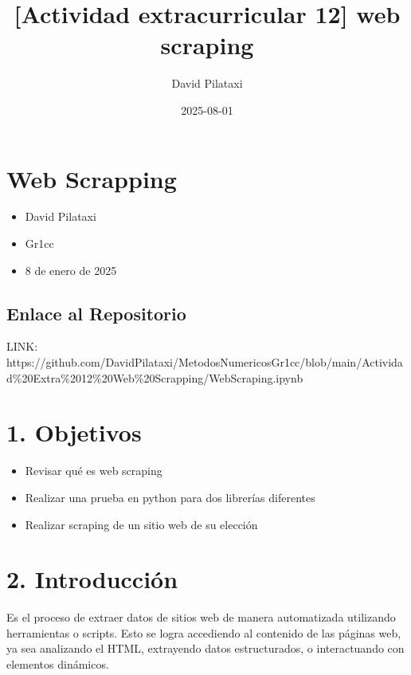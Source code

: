 \documentclass[
  letterpaper,
  DIV=11,
  numbers=noendperiod]{scrartcl}
\title{{[}Actividad extracurricular 12{]} web scraping}
\author{David Pilataxi}
\date{2025-08-01}
\providecommand{\tightlist}{%
  \setlength{\itemsep}{0pt}\setlength{\parskip}{0pt}}\usepackage{longtable,booktabs,array}
\renewcommand*\contentsname{Tabla de contenidos}
\newcommand\contentsname{Tabla de contenidos}
\begin{document}
\maketitle

\renewcommand*\contentsname{Tabla de Contenidos}
{
\hypersetup{linkcolor=}
\setcounter{tocdepth}{3}
\tableofcontents
}

\section{Web Scrapping}\label{web-scrapping}

\begin{itemize}
\tightlist
\item
  David Pilataxi
\item
  Gr1cc
\item
  8 de enero de 2025
\end{itemize}

\subsection{Enlace al Repositorio}\label{enlace-al-repositorio}

LINK:
https://github.com/DavidPilataxi/MetodosNumericosGr1cc/blob/main/Actividad\%20Extra\%2012\%20Web\%20Scrapping/WebScraping.ipynb

\section{1. Objetivos}\label{objetivos}

\begin{itemize}
\tightlist
\item
  Revisar qué es web scraping
\item
  Realizar una prueba en python para dos librerías diferentes
\item
  Realizar scraping de un sitio web de su elección
\end{itemize}

\section{2. Introducción}\label{introducciuxf3n}

Es el proceso de extraer datos de sitios web de manera automatizada
utilizando herramientas o scripts. Esto se logra accediendo al contenido
de las páginas web, ya sea analizando el HTML, extrayendo datos
estructurados, o interactuando con elementos dinámicos.
\end{document}
